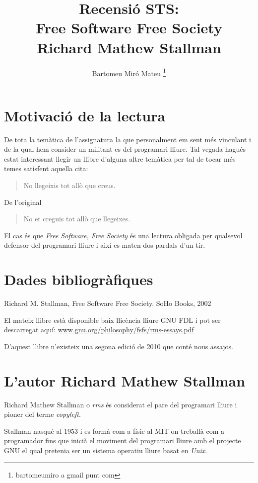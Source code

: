 \documentclass[a4paper,10pt]{scrartcl}
\title{\Large{Recensió STS:} \\ \huge{Free Software Free Society} \\ \normalsize{Richard Mathew Stallman}}
\author{Bartomeu Miró Mateu \thanks{bartomeumiro a gmail punt com} \\}
\begin{document}
  \maketitle

  \section{Motivació de la lectura}
De tota la temàtica de l'assignatura la que personalment em sent més vinculant i de
la qual hem consider un militant es del programari lliure. Tal vegada hagués
estat interessant llegir un llibre d'alguna altre temàtica per tal de tocar
més temes satisfent aquella cita:

\begin{quotation}
  No llegeixis tot allò que creus.
\end{quotation}

De l'original

\begin{quotation}
  No et creguis tot allò que llegeixes.
\end{quotation} 
 
El cas és que \emph{Free Software, Free Society} és una lectura obligada
per qualsevol defensor del programari lliure i així es maten dos pardals
d'un tir.

  \section{Dades bibliogràfiques}

  Richard M. Stallman, Free Software Free Society, SoHo Books, 2002
  
  El mateix llibre està disponible baix llicència lliure GNU FDL i pot ser descarregat aquí:
  \url{www.gnu.org/philosophy/fsfs/rms-essays.pdf}
  
  D'aquest llibre n'existeix una segona edició de 2010 que conté nous assajos.

  \section{L'autor Richard Mathew Stallman}
  
  Richard Mathew Stallman o \emph{rms} és considerat el pare del programari lliure i
pioner del terme \emph{copyleft}.

  Stallman nasqué al 1953 i es formà com a físic al MIT on treballà com a programador
fins que inicià el moviment del programari lliure amb el projecte GNU el qual
pretenia ser un sistema operatiu lliure basat en \emph{Unix}.
\end{document}

